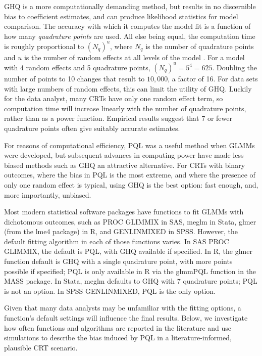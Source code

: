 \documentclass[Afour,times,sagev,doublespace]{sagej}
\begin{document}
GHQ is a more computationally demanding method, but results in no discernible bias to coefficient estimates, and can produce likelihood statistics for model comparison. The accuracy with which it computes the model fit is a function of how many \textit{quadrature points} are used. All else being equal, the computation time is roughly proportional to $(N_q)^u$, where $N_q$ is the number of quadrature points and $u$ is the number of random effects at all levels of the model \cite{statacorp_stata_2017}\cite{pinheiro_efficient_2006}. For a model with 4 random effects and 5 quadrature points, $(N_q)^u = 5^4 = 625$. Doubling the number of points to 10 changes that result to $10,000$, a factor of 16. For data sets with large numbers of random effects, this can limit the utility of GHQ.  Luckily for the data analyst, many CRTs have only one random effect term, so computation time will increase linearly with the number of quadrature points, rather than as a power function. Empirical results suggest that 7 or fewer quadrature points often give suitably accurate estimates\cite{pinheiro_approximations_1995}.

For reasons of computational efficiency, PQL was a useful method when GLMMs were developed, but subsequent advances in computing power have made less biased methods such as GHQ an attractive alternative. For CRTs with binary outcomes, where the bias in PQL is the most extreme\cite{ng_estimation_2006}\cite{lin_estimation_2007}, and where the presence of only one random effect is typical, using GHQ is the best option: fast enough, and, more importantly, unbiased.

Most modern statistical software packages have functions to fit GLMMs with dichotomous outcomes, such as PROC GLIMMIX in SAS, meglm in Stata, glmer (from the lme4 package) in R, and GENLINMIXED in SPSS. However, the default fitting algorithm in each of those functions varies. In SAS PROC GLIMMIX, the default is PQL, with GHQ available if specified. In R, the glmer function default is GHQ with a single quadrature point, with more points possible if specified; PQL is only available in R via the glmmPQL function in the MASS package. In Stata, meglm defaults to GHQ with 7 quadrature points; PQL is not an option. In SPSS GENLINMIXED, PQL is the only option.

Given that many data analysts may be unfamiliar with the fitting options, a function's default settings will influence the final results. Below, we investigate how often functions and algorithms are reported in the literature and use simulations to describe the bias induced by PQL in a literature-informed, plausible CRT scenario.
\end{document}
